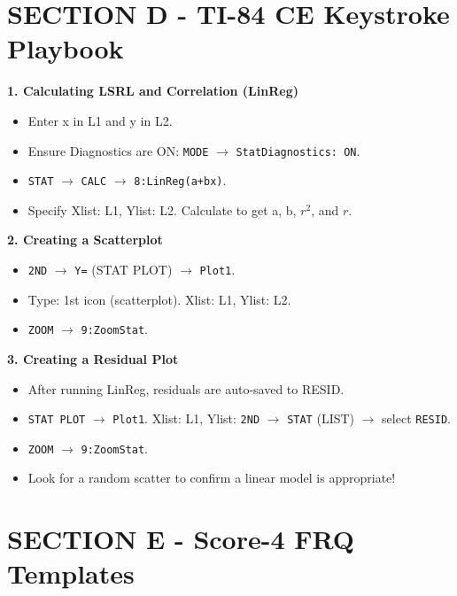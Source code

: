 \section{SECTION D - TI-84 CE Keystroke Playbook}
\begin{calculatorbox}
\textbf{1. Calculating LSRL and Correlation (LinReg)}
\begin{itemize}
    \item Enter x in L1 and y in L2.
    \item Ensure Diagnostics are ON: \texttt{MODE} $\rightarrow$ \texttt{StatDiagnostics: ON}.
    \item \texttt{STAT} $\rightarrow$ \texttt{CALC} $\rightarrow$ \texttt{8:LinReg(a+bx)}.
    \item Specify Xlist: L1, Ylist: L2. Calculate to get a, b, $r^2$, and $r$.
\end{itemize}

\textbf{2. Creating a Scatterplot}
\begin{itemize}
    \item \texttt{2ND} $\rightarrow$ \texttt{Y=} (STAT PLOT) $\rightarrow$ \texttt{Plot1}.
    \item Type: 1st icon (scatterplot). Xlist: L1, Ylist: L2.
    \item \texttt{ZOOM} $\rightarrow$ \texttt{9:ZoomStat}.
\end{itemize}

\textbf{3. Creating a Residual Plot}
\begin{itemize}
    \item After running LinReg, residuals are auto-saved to RESID.
    \item \texttt{STAT PLOT} $\rightarrow$ \texttt{Plot1}. Xlist: L1, Ylist: \texttt{2ND} $\rightarrow$ \texttt{STAT} (LIST) $\rightarrow$ select \texttt{RESID}.
    \item \texttt{ZOOM} $\rightarrow$ \texttt{9:ZoomStat}.
    \item Look for a random scatter to confirm a linear model is appropriate!
\end{itemize}
\end{calculatorbox}

\section{SECTION E - Score-4 FRQ Templates}

